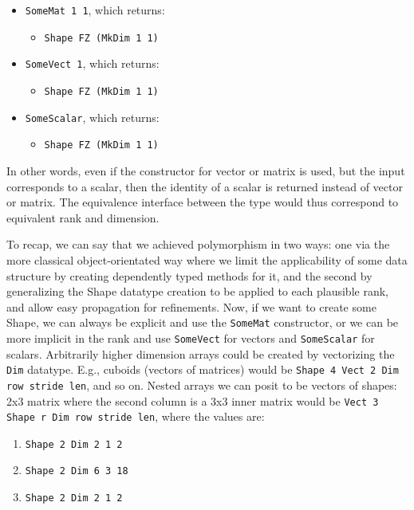 \documentclass{report}
\begin{document}
\begin{itemize}
  \item \verb|SomeMat 1 1|, which returns:
  \begin{itemize}
    \item \verb|Shape FZ (MkDim 1 1)|
  \end{itemize}
  \item \verb|SomeVect 1|, which returns:
  \begin{itemize}
    \item \verb|Shape FZ (MkDim 1 1)|
  \end{itemize}
  \item \verb|SomeScalar|, which returns:
  \begin{itemize}
    \item \verb|Shape FZ (MkDim 1 1)|
  \end{itemize}
\end{itemize}

In other words, even if the constructor for vector or matrix is used, but the input corresponds to a scalar, then the identity of a scalar is returned instead of vector or matrix. The equivalence interface between the type would thus correspond to equivalent rank and dimension.

To recap, we can say that we achieved polymorphism in two ways: one via the more classical object-orientated way where we limit the applicability of some data structure by creating dependently typed methods for it, and the second by generalizing the Shape datatype creation to be applied to each plausible rank, and allow easy propagation for refinements. Now, if we want to create some Shape, we can always be explicit and use the \verb|SomeMat| constructor, or we can be more implicit in the rank and use \verb|SomeVect| for vectors and \verb|SomeScalar| for scalars. Arbitrarily higher dimension arrays could be created by vectorizing the \verb|Dim| datatype. E.g., cuboids (vectors of matrices) would be \verb|Shape 4 Vect 2 Dim row stride len|, and so on. Nested arrays we can posit to be vectors of shapes: 2x3 matrix where the second column is a 3x3 inner matrix would be \verb|Vect 3 Shape r Dim row stride len|, where the values are:

\begin{enumerate}
    \item \verb|Shape 2 Dim 2 1 2|
    \item \verb|Shape 2 Dim 6 3 18|
    \item \verb|Shape 2 Dim 2 1 2|
\end{enumerate}
\end{document}
